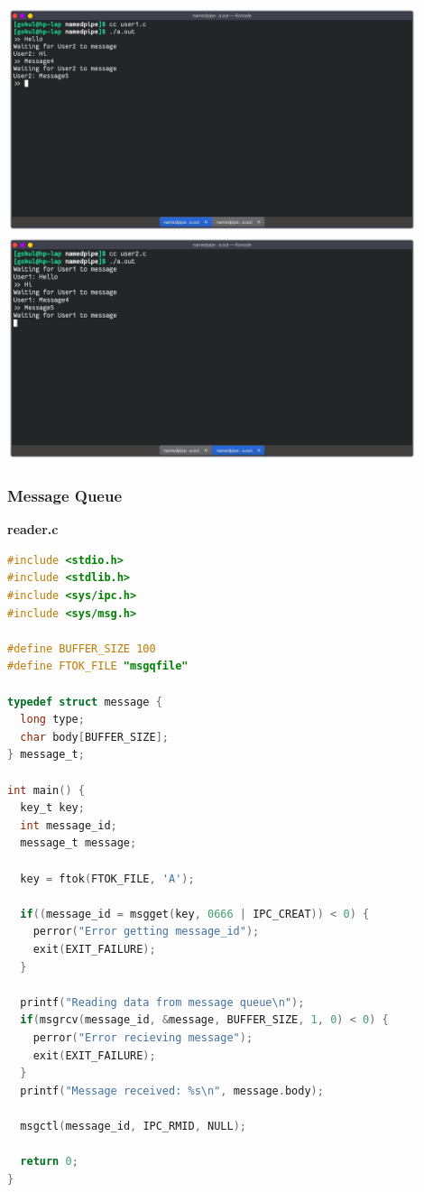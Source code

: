 \begin{center}
	\includegraphics[width=0.90\textwidth]{img/p4/ss2.png}
	\includegraphics[width=0.90\textwidth]{img/p4/ss3.png}
\end{center}

\subsubsection{Message Queue}
\textbf{reader.c}
\begin{lstlisting}[language=C]
#include <stdio.h>
#include <stdlib.h>
#include <sys/ipc.h>
#include <sys/msg.h>

#define BUFFER_SIZE 100
#define FTOK_FILE "msgqfile"

typedef struct message {
  long type;
  char body[BUFFER_SIZE];
} message_t;

int main() {
  key_t key;
  int message_id;
  message_t message;

  key = ftok(FTOK_FILE, 'A');

  if((message_id = msgget(key, 0666 | IPC_CREAT)) < 0) {
    perror("Error getting message_id");
    exit(EXIT_FAILURE);
  }

  printf("Reading data from message queue\n");
  if(msgrcv(message_id, &message, BUFFER_SIZE, 1, 0) < 0) {
    perror("Error recieving message");
    exit(EXIT_FAILURE);
  }
  printf("Message received: %s\n", message.body);

  msgctl(message_id, IPC_RMID, NULL);

  return 0;
}
\end{lstlisting}


